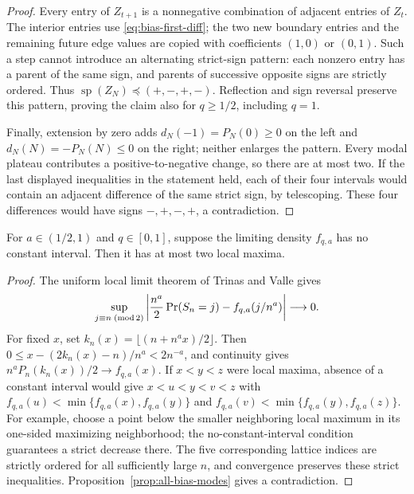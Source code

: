 \begin{proof}
Every entry of $Z_{t+1}$ is a nonnegative combination of adjacent entries
of $Z_t$. The interior entries use \eqref{eq:bias-first-diff}; the two
new boundary entries and the remaining future edge values are copied
with coefficients $(1,0)$ or $(0,1)$. Such a step cannot introduce an
alternating strict-sign pattern: each nonzero entry has a parent of the
same sign, and parents of successive opposite signs are strictly ordered.
Thus $\operatorname{sp}(Z_N)\preceq(+,-,+,-)$. Reflection and sign
reversal preserve this pattern, proving the claim also for $q\ge1/2$,
including $q=1$.

Finally, extension by zero adds $d_N(-1)=P_N(0)\ge0$ on the left and
$d_N(N)=-P_N(N)\le0$ on the right; neither enlarges the pattern.
Every modal plateau contributes a positive-to-negative change, so there
are at most two. If the last displayed inequalities in the statement
held, each of their four intervals would contain an adjacent difference
of the same strict sign, by telescoping. These four differences would
have signs $-,+,-,+$, a contradiction.
\end{proof}

\begin{corollary}\label{cor:all-bias-limit-modes}
For $a\in(1/2,1)$ and $q\in[0,1]$, suppose the limiting density
$f_{q,a}$ has no constant interval. Then it has at most two local maxima.
\end{corollary}
\begin{proof}
The uniform local limit theorem of Trinas and Valle gives
\[
 \sup_{j\equiv n\;({\rm mod}\,2)}
 \left|\frac{n^a}{2}\Pr(S_n=j)-f_{q,a}(j/n^a)\right|\longrightarrow0.
\]
For fixed $x$, set $k_n(x)=\lfloor(n+n^a x)/2\rfloor$. Then
$0\le x-(2k_n(x)-n)/n^a<2n^{-a}$, and continuity gives
$n^aP_n(k_n(x))/2\to f_{q,a}(x)$.
If $x<y<z$ were local maxima, absence of a constant interval would give
$x<u<y<v<z$ with
$f_{q,a}(u)<\min\{f_{q,a}(x),f_{q,a}(y)\}$ and
$f_{q,a}(v)<\min\{f_{q,a}(y),f_{q,a}(z)\}$.
For example, choose a point below the smaller neighboring local maximum
in its one-sided maximizing neighborhood; the no-constant-interval
condition guarantees a strict decrease there.
The five corresponding lattice indices are strictly ordered for all
sufficiently large $n$, and convergence preserves these strict
inequalities. Proposition~\ref{prop:all-bias-modes} gives a contradiction.
\end{proof}

